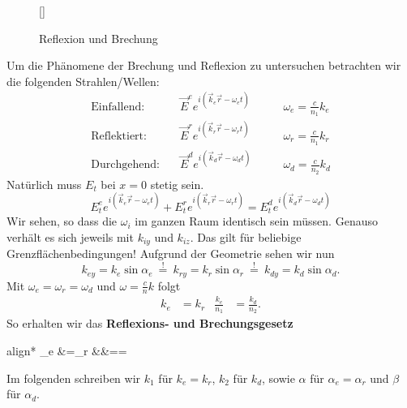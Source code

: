 \begin{wrapfigure}[11]{r}[0cm]{0cm}
	\raisebox{0pt}[\dimexpr{}\baselineskip\relax]{
		\colorbox{hgrey}{
		}
	}
	\caption{Reflexion und Brechung}
\end{wrapfigure}
Um die Phänomene der Brechung und Reflexion zu untersuchen betrachten wir die folgenden Strahlen/Wellen:
\begin{align*}
\text{Einfallend:}\quad &\vec{E}^e e^{i(\vec{k}_e\vec{r}-\omega_e t)} &\qquad \omega_e =\frac{c}{n_1}k_e \\
\text{Reflektiert:}\quad&\vec{E}^r e^{i(\vec{k}_r\vec{r}-\omega_r t)} &\qquad \omega_r = \frac{c}{n_1}k_r \\
\text{Durchgehend:}\quad &\vec{E}^d e^{i(\vec{k}_d\vec{r}-\omega_d t)}&\qquad \omega_d=\frac{c}{n_2}k_d
\end{align*}
Natürlich muss $E_t$ bei $x=0$ stetig sein. 
\begin{equation*}
E_t^e e^{i(\vec{k}_e\vec{r}-\omega_e t)} + E_t^r e^{i(\vec{k}_r\vec{r}-\omega_r t)} = E_t^d e^{i(\vec{k}_d\vec{r}-\omega_d t)}
\end{equation*}
Wir sehen, so dass die $\omega_i$ im ganzen Raum identisch sein müssen. Genauso verhält es sich jeweils mit $k_{iy}$ und $k_{iz}$. Das gilt für beliebige Grenzflächenbedingungen! Aufgrund der Geometrie sehen wir nun
\begin{equation*}
k_{ey}=k_e\sin\alpha_e\ \stackrel{!}{=}\ k_{ry} = k_r\sin\alpha_r\ \stackrel{!}{=}\
k_{dy}=k_d\sin\alpha_d.
\end{equation*}
Mit $\omega_e=\omega_r=\omega_d$ und $\omega=\frac{c}{n}k$ folgt
\begin{align*}
k_e&=k_r &\frac{k_e}{n_1}&=\frac{k_d}{n_2}.
\end{align*}
So erhalten wir das \textbf{Reflexions- und Brechungsgesetz}
\begin{empheq}[box=\highlightbox]{align*}
\sin\alpha_e &=\sin\alpha_r &&== 
\end{empheq}
Im folgenden schreiben wir $k_1$ für $k_e=k_r$, $k_2$ für $k_d$, sowie $\alpha$ für $\alpha_e=\alpha_r$ und $\beta$ für $\alpha_d$.\\

